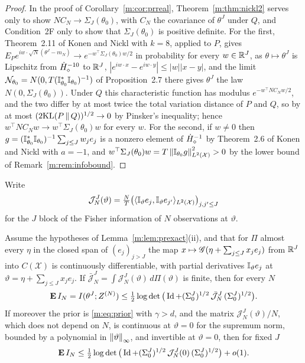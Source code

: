 \begin{proof}
In the proof of Corollary~\ref{m:cor:prreal}, Theorem~\ref{m:thm:nickl2} serves only to show $NC_N\to\Sigma_J(\theta_0)$, with $C_N$ the covariance of $\theta^J$ under $Q$, and Condition~2F only to show that $\Sigma_J(\theta_0)$ is positive definite. For the first, Theorem~2.11 of Konen and Nickl with $k=8$, applied to $P$, gives $E_Pe^{iw\cdot\sqrt N(\theta^J-m_N)}\to e^{-w^\top\Sigma_J(\theta_0)w/2}$ in probability for every $w\in\mathbb{R}^J$, as $\theta\mapsto\theta^J$ is Lipschitz from $\dot H^{-10}_\diamond$ to $\mathbb{R}^J$, $|e^{iw\cdot x}-e^{iw\cdot y}|\le|w||x-y|$, and the limit $\mathcal{N}_{\theta_0}=N(0,T(\mathbb{I}^*_{\theta_0}\mathbb{I}_{\theta_0})^{-1})$ of Proposition~2.7 there gives $\theta^J$ the law $N(0,\Sigma_J(\theta_0))$. Under $Q$ this characteristic function has modulus $e^{-w^\top NC_Nw/2}$, and the two differ by at most twice the total variation distance of $P$ and $Q$, so by at most $(2\mathrm{KL}(P\,\|\,Q))^{1/2}\to0$ by Pinsker's inequality; hence $w^\top NC_Nw\to w^\top\Sigma_J(\theta_0)w$ for every $w$. For the second, if $w\ne0$ then $g=(\mathbb{I}^*_{\theta_0}\mathbb{I}_{\theta_0})^{-1}\sum_{j\le J}w_je_j$ is a nonzero element of $\dot H^{-1}_\diamond$ by Theorem~2.6 of Konen and Nickl with $a=-1$, and $w^\top\Sigma_J(\theta_0)w=T\left\|\mathbb{I}_{\theta_0}g\right\|^2_{L^2(\mathcal X)}>0$ by the lower bound of Remark~\ref{m:rem:infobound}.
\end{proof}

Write
\[
\mathcal J^J_N(\vartheta)=\tfrac NT\big(\langle\mathbb{I}_\vartheta e_j,\mathbb{I}_\vartheta e_{j'}\rangle_{L^2(\mathcal X)}\big)_{j,j'\le J}
\]
for the $J$ block of the Fisher information of $N$ observations at $\vartheta$.

\begin{proposition}\label{m:prop:prvt}
Assume the hypotheses of Lemma~\ref{m:lem:prexact}(ii), and that for $\Pi$ almost every $\eta$ in the closed span of $(e_j)_{j>J}$ the map $x\mapsto\mathscr{G}(\eta+\sum_{j\le J}x_je_j)$ from $\mathbb{R}^J$ into $C(\mathcal X)$ is continuously differentiable, with partial derivatives $\mathbb{I}_\vartheta e_j$ at $\vartheta=\eta+\sum_{j\le J}x_je_j$. If $\bar{\mathcal J}^J_N=\int\mathcal J^J_N(\vartheta)\,d\Pi(\vartheta)$ is finite, then for every $N$
\begin{equation}\label{m:eq:prvt}
\mathbf E\,I_N=I(\theta^J;Z^{(N)})\le\tfrac12\log\det\big(\operatorname{Id}+(\Sigma^J_0)^{1/2}\,\bar{\mathcal J}^J_N\,(\Sigma^J_0)^{1/2}\big).
\end{equation}
If moreover the prior is \eqref{m:eq:prior} with $\gamma>d$, and the matrix $\mathcal J^J_N(\vartheta)/N$, which does not depend on $N$, is continuous at $\vartheta=0$ for the supremum norm, bounded by a polynomial in $\left\|\vartheta\right\|_\infty$, and invertible at $\vartheta=0$, then for fixed $J$
\begin{equation}\label{m:eq:prvtzero}
\mathbf E\,I_N\le\tfrac12\log\det\big(\operatorname{Id}+(\Sigma^J_0)^{1/2}\,\mathcal J^J_N(0)\,(\Sigma^J_0)^{1/2}\big)+o(1).
\end{equation}
\end{proposition}


